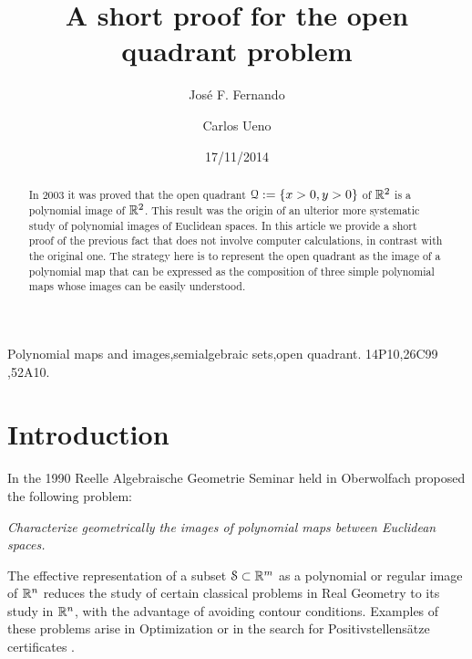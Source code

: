 \documentclass[1p]{elsarticle}
\newcommand{\Ss}{{\EuScript S}}
\newcommand{\Qq}{{\EuScript Q}}
\begin{document}
\title{A short proof for the open quadrant problem}
\author{Jos\'e F. Fernando}
\address{Departamento de \'Algebra, Facultad de Ciencias Matem\'aticas, Universidad Complutense de Madrid\\ 28040 MADRID (SPAIN)}

\author{Carlos Ueno}
\address{Dipartimento di Matematica, Universit\`a degli Studi di Pisa, Largo Bruno Pontecorvo, 5\\ 56127 PISA (ITALY)}


\date{17/11/2014}
\begin{keyword}
Polynomial maps and images\sep semialgebraic sets\sep open quadrant.
\MSC 14P10\sep 26C99 \sep 52A10.
\end{keyword}

\begin{abstract}
In 2003 it was proved that the open quadrant $\Qq:=\{x>0,y>0\}$ of ${\mathbb R}^2$ is a polynomial image of ${\mathbb R}^2$. This result was the origin of an ulterior more systematic study of polynomial images of Euclidean spaces. In this article we provide a short proof of the previous fact that does not involve computer calculations, in contrast with the original one. The strategy here is to represent the open quadrant as the image of a polynomial map that can be expressed as the composition of three simple polynomial maps whose images can be easily understood.
\end{abstract}
\maketitle

\section{Introduction}
In the 1990 Reelle Algebraische Geometrie Seminar held in Oberwolfach \citet{g} proposed the following problem: 
\begin{center}
\em Characterize geometrically the images of polynomial maps between Euclidean spaces. 
\end{center}
The effective representation of a subset $\Ss\subset\R^m$ as a polynomial or regular image of ${\mathbb R}^n$ reduces the study of certain classical problems in Real Geometry to its study in ${\mathbb R}^n$, with the advantage of avoiding contour conditions. Examples of these problems arise in Optimization or in the search for Positivstellens\"atze certificates \citep{fg2,fu2}. 
\end{document}
